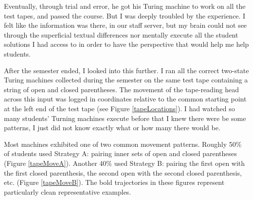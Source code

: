 Eventually, through trial and error, he got his Turing machine to work on all the test tapes, and passed the course. But I was deeply troubled by the experience. I felt like the information was there, in our staff server, but my brain could not see through the superficial textual differences nor mentally execute all the student solutions I had access to in order to have the perspective that would help me help students.

After the semester ended, I looked into this further. I ran all the correct two-state Turing machines collected during the semester on the same test tape containing a string of open and closed parentheses. The movement of the tape-reading head across this input was logged in coordinates relative to the common starting point at the left end of the test tape (see Figure \ref{tapeLocations}). I had watched so many students' Turning machines execute before that I knew there were be some patterns, I just did not know exactly what or how many there would be.

Most machines exhibited one of two common movement patterns. Roughly 50\% of students used Strategy A: pairing inner sets of open and closed parentheses (Figure \ref{tapeMoveA}). Another 40\% used Strategy B: pairing the first open with the first closed parenthesis, the second open with the second closed parenthesis, etc. (Figure \ref{tapeMoveB}). The bold trajectories in these figures represent particularly clean representative examples.

